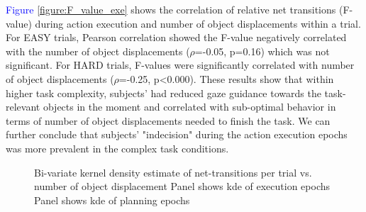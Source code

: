 \textcolor{Blue}{Figure \ref{figure:F_value_exe}} shows the correlation of relative net transitions (F-value) during action execution and number of object displacements within a trial. For EASY trials, Pearson correlation showed the F-value negatively correlated with the number of object displacements ($\rho$=-0.05, p=0.16) which was not significant. For HARD trials, F-values were significantly correlated with number of object displacements ($\rho$=-0.25, p<0.000). These results show that within higher task complexity, subjects' had reduced gaze guidance towards the task-relevant objects in the moment and correlated with sub-optimal behavior in terms of number of object displacements needed to finish the task. We can further conclude that subjects' "indecision" during the action execution epochs was more prevalent in the complex task conditions.

\begin{figure}[h]
    \centering
    \caption[]{Bi-variate kernel density estimate of net-transitions per trial vs. number of object displacement
    Panel \protect{} shows kde of execution epochs
    Panel \protect{} shows kde of planning epochs}
     \label{figure:kde}
\end{figure}

